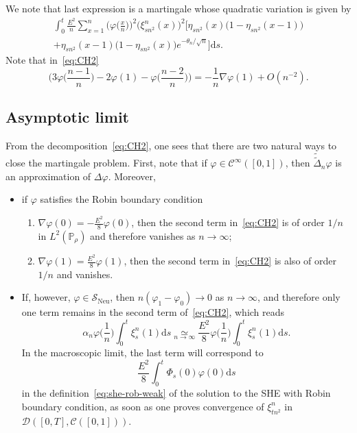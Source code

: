 \documentclass[10pt]{amsart}
\theoremstyle{definition}\newtheorem{defi}[theo]{Definition}\newtheorem{rema}[theo]{Remark}\newtheorem{exam}[theo]{Example}\newtheorem{exem}[theo]{Example}\newtheorem{nota}[theo]{Notation}
\DeclareMathOperator{\Neu}{Neu}
\newcommand{\bb}[1]{{\mathbb #1}}
\newcommand{\mc}[1]{{\mathcal #1}}
\renewcommand{\mc}[1]{{\mathcal #1}}
\newcommand{\SN}{\ensuremath{\mc S_{\Neu}}}
\renewcommand{\tilde}{\widetilde}
\newcommand*{\dd}{\mathrm{d}}
\newcommand*{\ds}{\dd s}
\newcommand*{\romanenumi}{\renewcommand*{\theenumi}{\roman{enumi}}}
\renewcommand{\tfrac}{\frac}
\begin{document}
We note that last expression is a martingale whose quadratic variation is given by
\begin{multline}\label{eq:QV-CH}
\int_0^t \frac{E^2}{n} \sum_{x=1}^n\Big(\varphi\Big(\tfrac x n\Big)\Big)^2\big(\xi_{{sn^2}}^n(x)\big)^2 \Big[\eta_{sn^2}(x)\big(1-\eta_{sn^2}(x-1)\big) \\ + \eta_{sn^2}(x-1)\big(1-\eta_{sn^2}(x)\big) e^{-\theta_n/\sqrt n}\Big]\ds.
\end{multline}
Note that in~\eqref{eq:CH2}
\[
\Big(3\varphi\Big(\tfrac{n-1}{n}\Big)-2\varphi(1)-\varphi\Big(\tfrac{n-2}{n}\Big)\Big)=-\tfrac{1}{n}\nabla \varphi(1)+ O(n^{-2}).
\]

\subsection{Asymptotic limit}

From the decomposition~\eqref{eq:CH2}, one sees that there are two natural ways to close the martingale problem. First, note that if $\varphi \in \mc C^\infty([0,1])$, then $\tilde{\tilde\Delta}_n\varphi$ is an approximation of $\Delta\varphi$. Moreover,
\begin{itemize}
\item if $\varphi$ satisfies the Robin boundary condition
\begin{enumerate}\romanenumi
\item $\nabla\varphi(0) = -\frac{E^2}{8}\varphi(0)$, then the second term in~\eqref{eq:CH2} is of order $1/n$ in $L^2(\bb P_\rho)$ and therefore vanishes as $n\to\infty$;

\item $\nabla\varphi(1)= \frac{E^2}{8}\varphi(1)$, then the second term in~\eqref{eq:CH2} is also of order $1/ n$ and vanishes.
\end{enumerate}

\item If, however, $\varphi \in \SN$, then $n(\varphi_1-\varphi_0) \to 0$ as $n\to\infty$, and therefore only one term remains in the second term of~\eqref{eq:CH2}, which reads
\[
\alpha_n \varphi\Big(\tfrac 1 n\Big)\int_0^t \xi_s^n(1)\ds \underset{n\to\infty}{\simeq} \tfrac{E^2}{8} \varphi\Big(\tfrac 1 n\Big)\int_0^t\xi_s^n(1)\ds.
\]
In the macroscopic limit, the last term will correspond to
\[
\tfrac{E^2}{8} \int_0^t \Phi_s(0)\varphi(0)\ds
\]
in the definition~\eqref{eq:she-rob-weak} of the solution to the SHE with Robin boundary condition, as soon as one proves convergence of $\xi_{{tn^2}}^n$ in ${\mc D}([0,T],\mc C([0,1]))$.
\end{itemize}
\end{document}
